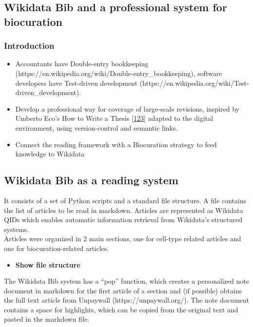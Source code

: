 \hypertarget{wikidata-bib-and-a-professional-system-for-biocuration}{%
\subsection{Wikidata Bib and a professional system for biocuration}\label{wikidata-bib-and-a-professional-system-for-biocuration}}

\hypertarget{introduction-1}{%
\subsubsection{Introduction}\label{introduction-1}}

\begin{itemize}
\item
  Accountants have Double-entry bookkeeping (https://en.wikipedia.org/wiki/Double-entry\_bookkeeping), software developers have Test-driven development (https://en.wikipedia.org/wiki/Test-driven\_development).
\item
  Develop a professional way for coverage of large-scale revisions, inspired by Umberto Eco's How to Write a Thesis {[}\protect\hyperlink{ref-1HBVPtZGp}{123}{]} adapted to the digital environment, using version-control and semantic links.
\item
  Connect the reading framework with a Biocuration strategy to feed knowledge to Wikidata
\end{itemize}

\hypertarget{wikidata-bib-as-a-reading-system}{%
\subsection{Wikidata Bib as a reading system}\label{wikidata-bib-as-a-reading-system}}

It consists of a set of Python scripts and a standard file structure.
A file contains the list of articles to be read in markdown. Articles are represented as Wikidata QIDs which enables automatic information retrieval from Wikidata's structured systems.\\
Articles were organized in 2 main sections, one for cell-type related articles and one for biocuration-related articles.

\begin{itemize}
\tightlist
\item
  \textbf{Show file structure}
\end{itemize}

The Wikidata Bib system has a ``pop'' function, which creates a personalized note document in markdown for the first article of a section and (if possible) obtains the full text article from Unpaywall (https://unpaywall.org/).
The note document contains a space for highlights, which can be copied from the original text and pasted in the markdown file.

